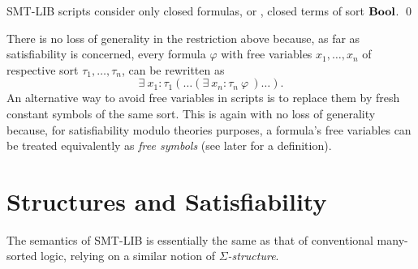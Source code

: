 \begin{constraint}
SMT-LIB scripts consider only closed formulas,
or , closed terms of sort $\textbf{Bool}$.
\qed
\end{constraint}

There is no loss of generality in the restriction above because,
as far as satisfiability is concerned,
every formula $\varphi$ with free variables 
$x_1, \ldots, x_n$ of respective sort $\tau_1, \ldots, \tau_n$,
can be rewritten as 
\[
 \exists\: x_1{:}\tau_1 ( \ldots (\exists\:x_n{:}\tau_n\: \varphi\ )\ldots).
\]
An alternative way to avoid free variables in scripts is 
to replace them by fresh constant symbols of the same sort.
This is again with no loss of generality because,
for satisfiability modulo theories purposes,
a formula's free variables can be treated equivalently as 
\emph{free symbols} (see later for a definition).


\section{Structures and Satisfiability} \label{sec:models}

The semantics of SMT-LIB is essentially the same as that 
of conventional many-sorted logic,
relying on a similar notion of \emph{$\Sigma$-structure}.



